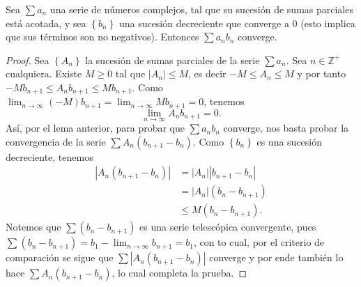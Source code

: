 \begin{theorem}
  Sea $\sum a_{n}$ una serie de números complejos, tal que su sucesión de sumas parciales está acotada, y sea $\left\{b_{n}\right\}$ una sucesión decreciente que converge a $0$ (esto implica que sus términos son no negativos). Entonces $\sum a_{n} b_{n}$ converge.
\end{theorem}
\begin{proof}
  Sea $\left\{A_{n}\right\}$ la sucesión de sumas parciales de la serie $\sum a_{n}$. Sea $n \in \mathbb{Z}^{+}$ cualquiera. Existe $M \geq 0$ tal que $\left|A_{n}\right| \leq M$, es decir $-M \leq A_{n} \leq M$ y por tanto $-M b_{n+1} \leq A_{n} b_{n+1} \leq M b_{n+1}$. Como $\lim _{n \rightarrow \infty}(-M) b_{n+1}=\lim _{n \rightarrow \infty} M b_{n+1}=0$, tenemos
  $$
    \lim _{n \rightarrow \infty} A_{n} b_{n+1}=0.
  $$
  Así, por el lema anterior, para probar que $\sum a_nb_n$ converge, nos basta probar la convergencia de la serie $\sum A_{n}\left(b_{n+1}-b_{n}\right)$. Como $\left\{b_{n}\right\}$ es una sucesión decreciente, tenemos
  $$
    \begin{aligned}
    \left|A_{n}\left(b_{n+1}-b_{n}\right)\right| & =\left|A_{n}\right|\left|b_{n+1}-b_{n}\right| \\
    & =\left|A_{n}\right|\left(b_{n}-b_{n+1}\right) \\
    & \leq M\left(b_{n}-b_{n+1}\right).
    \end{aligned}
  $$
  Notemos que $\sum\left(b_{n}-b_{n+1}\right)$ es una serie telescópica convergente, pues $\sum\left(b_{n}-b_{n+1}\right)=b_{1}-\lim _{n \rightarrow \infty} b_{n+1}=b_{1}$, con to cual, por el criterio de comparación se sigue que $\sum\left|A_{n}\left(b_{n+1}-b_{n}\right)\right|$ converge y por ende también lo hace $\sum A_{n}\left(b_{n+1}-b_{n}\right)$, lo cual completa la prueba.
\end{proof}

